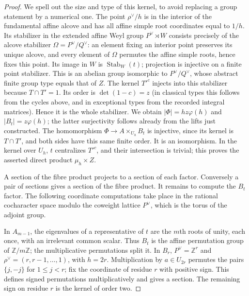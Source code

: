 \begin{proof}
We spell out the size and type of this kernel, to avoid replacing a
group statement by a numerical one.  The point $\rho^\vee/h$ is in the
interior of the fundamental affine alcove and has all affine simple
root coordinates equal to $1/h$.  Its stabilizer in the extended
affine Weyl group $P^\vee\rtimes W$ consists precisely of the alcove
stabilizer $\Omega=P^\vee/Q^\vee$: an element fixing an interior point
preserves its unique alcove, and every element of $\Omega$ permutes
the affine simple roots, hence fixes this point.  Its image in $W$ is
$\operatorname{Stab}_W(t)$; projection is injective on a finite point
stabilizer.  This is an abelian group isomorphic to $P^\vee/Q^\vee$,
whose abstract finite group type equals that of $Z$.
The kernel $T'^c$ injects into this stabilizer because $T\cap T'=1$.
Its order is $\det(1-c)=z$ (in classical types this follows from the
cycles above, and in exceptional types from the recorded integral
matrices).  Hence it is the whole stabilizer.  We obtain
$|\Phi|=hz\varphi(h)$ and $|B_t|=z\varphi(h)$; the latter
surjectivity follows already from the lifts just constructed.
The homomorphism $\Phi\to A\times_{U_h}B_t$ is injective, since its
kernel is $T\cap T'$, and both sides have this same finite order.
It is an isomorphism.  In the kernel over $U_h$, $t$ centralizes
$T'^c$, and their intersection is trivial; this proves the asserted
direct product $\mu_h\times Z$.

A section of the fibre product projects to a section of each factor.
Conversely a pair of sections gives a section of the fibre product.
It remains to compute the $B_t$ factor.  The following coordinate
computations take place in the rational cocharacter space modulo the
coweight lattice $P^\vee$, which is the torus of the adjoint group.

In $A_{m-1}$, the eigenvalues of a representative of $t$ are the $m$th
roots of unity, each once, with an irrelevant common scalar.  Thus
$B_t$ is the affine permutation group of $\mathbb Z/m\mathbb Z$;
the multiplicative permutations split it.
In $B_r$, $P^\vee=\mathbb Z^r$ and
$\rho^\vee=(r,r-1,\ldots,1)$, with $h=2r$.
Multiplication by $a\in U_{2r}$ permutes the pairs $\{j,-j\}$ for
$1\le j<r$; fix the coordinate of residue $r$ with positive sign.
This defines signed permutations multiplicatively and gives a section.
The remaining sign on residue $r$ is the kernel of order two.


\end{proof}
